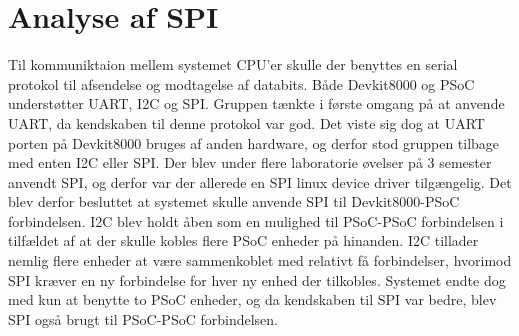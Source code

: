\section{Analyse af SPI}
Til kommuniktaion mellem systemet CPU'er skulle der benyttes en serial protokol til afsendelse og modtagelse af databits.
Både Devkit8000 og PSoC understøtter UART, I2C og SPI. Gruppen tænkte i første omgang på at anvende UART, da kendskaben til denne protokol var god.
Det viste sig dog at UART porten på Devkit8000 bruges af anden hardware, og derfor stod gruppen tilbage med enten I2C eller SPI. Der blev under flere 
laboratorie øvelser på 3 semester anvendt SPI, og derfor var der allerede en SPI linux device driver tilgængelig. Det blev derfor besluttet at systemet 
skulle anvende SPI til Devkit8000-PSoC forbindelsen. I2C blev holdt åben som en mulighed til PSoC-PSoC forbindelsen i tilfældet af at der skulle kobles 
flere PSoC enheder på hinanden. I2C tillader nemlig flere enheder at være sammenkoblet med relativt få forbindelser, hvorimod SPI kræver en ny forbindelse for 
hver ny enhed der tilkobles. Systemet endte dog med kun at benytte to PSoC enheder, og da kendskaben til SPI var bedre, blev SPI også brugt til PSoC-PSoC
forbindelsen.     